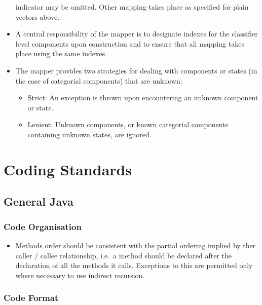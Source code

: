 \documentclass[a4paper,fleqn]{article}
\begin{document}
\begin{itemize}
  indicator may be omitted. Other mapping takes place as specified for
  plain vectors above.
\item A central responsibility of the mapper is to designate indexes
  for the classifier level components upon construction and to ensure
  that all mapping takes place using the same indexes.
\item The mapper provides two strategies for dealing with components
  or states (in the case of categorial components) that are unknown:
  \begin{itemize}
  \item Strict: An exception is thrown upon encountering an unknown
    component or state.
  \item Lenient: Unknown components, or known categorial components
    containing unknown states, are ignored.
  \end{itemize}
\end{itemize}


\section{Coding Standards}


\subsection{General Java}

\subsubsection{Code Organisation}

\begin{itemize}

\item Methods order should be consistent with the partial ordering
  implied by ther caller / callee relationship, i.e.\ a method should
  be declared after the declaration of all the methods it
  calls. Exceptions to this are permitted only where necessary to use
  indirect recursion.

\end{itemize}


\subsubsection{Code Format}
\end{document}
